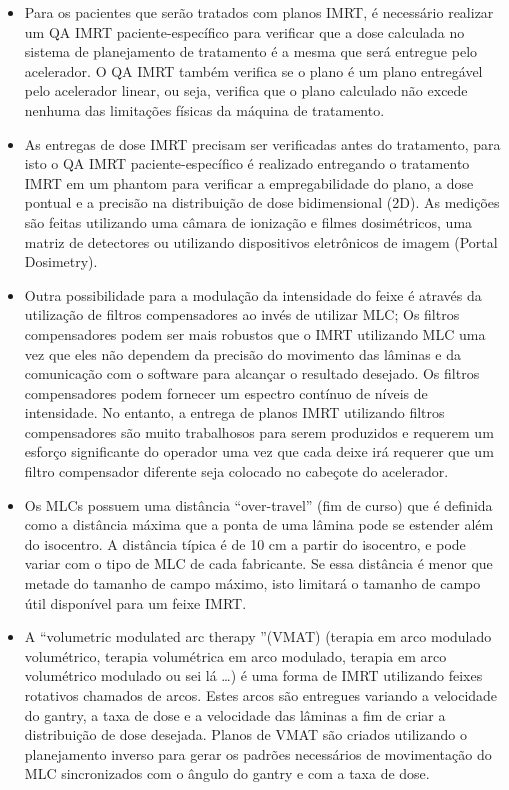 \documentclass[11pt,a4paper]{article}
\newcounter{exemplo}
\begin{document}
\begin{exemplo}
\begin{itemize}
        \item Para os pacientes que serão tratados com planos IMRT, é necessário realizar um QA IMRT paciente-específico para verificar que a dose calculada no sistema de planejamento de tratamento é a mesma que será entregue pelo acelerador. O QA IMRT também verifica se o plano é um plano entregável pelo acelerador linear, ou seja, verifica que o plano calculado não excede nenhuma das limitações físicas da máquina de tratamento.
        
        \item As entregas de dose IMRT precisam ser verificadas antes do tratamento, para isto o QA IMRT paciente-específico é realizado entregando o tratamento IMRT em um phantom para verificar a empregabilidade do plano, a dose pontual e a precisão na distribuição de dose bidimensional (2D). As medições são feitas utilizando uma câmara de ionização e filmes dosimétricos, uma matriz de detectores ou utilizando dispositivos eletrônicos de imagem (Portal Dosimetry).
        
        \item Outra possibilidade para a modulação da intensidade do feixe é através da utilização de filtros compensadores ao invés de utilizar MLC; Os filtros compensadores podem ser mais robustos que o IMRT utilizando MLC uma vez que eles não dependem da precisão do movimento das lâminas e da comunicação com o software para alcançar o resultado desejado. Os filtros compensadores podem fornecer um espectro contínuo de níveis de intensidade. No entanto, a entrega de planos IMRT utilizando filtros compensadores são muito trabalhosos para serem produzidos e requerem um esforço significante do operador uma vez que cada deixe irá requerer que um filtro compensador diferente seja colocado no cabeçote do acelerador. 
        
        \item Os MLCs possuem uma distância ``over-travel'' (fim de curso)  que é definida como a distância máxima que a ponta de uma lâmina pode se estender além do isocentro. A distância típica é de 10 cm a partir do isocentro, e pode variar com o tipo de MLC de cada fabricante. Se essa distância é menor que metade do tamanho de campo máximo, isto limitará o tamanho de campo útil disponível para um feixe IMRT. 

        \item A ``volumetric modulated arc therapy ''(VMAT) (terapia em arco modulado volumétrico, terapia volumétrica em arco modulado, terapia em arco volumétrico modulado ou sei lá \dots) é uma forma de IMRT utilizando feixes rotativos chamados de arcos. Estes arcos são entregues variando a velocidade do gantry, a taxa de dose e a velocidade das lâminas a fim de criar a distribuição de dose desejada. Planos de VMAT são criados utilizando o planejamento inverso para gerar os padrões necessários de movimentação do MLC sincronizados com o ângulo do gantry e com a taxa de dose.
        

\end{itemize}
\end{exemplo}
\end{document}
